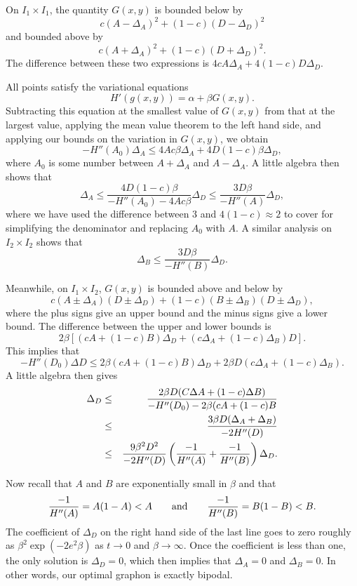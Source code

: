 \documentclass[12pt]{amsart}
\newcommand\be{\begin{equation}}
\newcommand\ee{\end{equation}}
\begin{document}
{On $I_1 \times I_1$, the quantity $G(x,y)$ is bounded below by 
\be c (A- \Delta_A)^2 + (1-c) (D - \Delta_D)^2 \ee
and bounded above by 
\be c (A+ \Delta_A)^2 + (1-c) (D + \Delta_D)^2. \ee
The difference between these two expressions is $4cA\Delta_A + 4(1-c)D \Delta_D$. 

All points satisfy the variational equations 
\be H'(g(x,y)) = \alpha + \beta G(x,y). \ee
Subtracting this equation at the smallest value of $G(x,y)$ from that at the largest value, applying 
the mean value theorem to the left hand side, and applying our bounds on the variation in 
$G(x,y)$, we obtain
\be - H''(A_0) \Delta _A \le 4Ac\beta \Delta_A + 4D(1-c)\beta \Delta_D, \ee
where $A_0$ is some number between $A+\Delta_A$ and $A-\Delta_A$.  A little algebra then shows that 
\be \Delta_A \le \frac{4D(1-c)\beta}{-H''(A_0) - 4Ac\beta} \Delta_D \le \frac{3D\beta}{-H''(A)} \Delta_D,\ee
where we have used the difference between 3 and $4(1-c) \approx 2$ to cover for simplifying the 
denominator and replacing $A_0$ with $A$. A similar analysis on $I_2 \times I_2$ shows that 
\be \Delta_B \le \frac{3D\beta}{-H''(B)} \Delta_D. \ee

Meanwhile, on $I_1 \times I_2$, $G(x,y)$ is bounded above and below by 
\be c(A \pm \Delta_A)(D \pm \Delta_D) + (1-c)(B \pm \Delta_B)(D \pm \Delta_D), \ee
where the plus signs give an upper bound and the minus signs give a lower bound. The difference between
the upper and lower bounds is 
\be 2 \beta [ (cA+(1-c)B)\Delta_D + (c \Delta_A + (1-c) \Delta_B) D]. \ee
This implies that 
\be -H''(D_0) \Delta D  \le 2\beta (cA+(1-c)B) \Delta_D + 2 \beta D (c \Delta_A + (1-c)\Delta_B). \ee
A little algebra then gives 
\begin{eqnarray} 
\Delta_D &\le& \frac{2 \beta D (C \Delta A + (1-c)\Delta B)}{-H''(D_0)-2\beta(cA+(1-c)B} \cr 
& \le & \frac{3 \beta D(\Delta_A + \Delta_B)}{-2H''(D)} \cr 
&\le & \frac{9 \beta^2 D^2}{-2H''(D)} \left( \frac{-1}{H''(A)} + \frac{-1}{H''(B)} \right ) \Delta_D. 
\end{eqnarray}

Now recall that $A$ and $B$ are exponentially small in $\beta$ and that 
\be \frac{-1}{H''(A)} = A(1-A) < A \qquad \hbox{and} \qquad \frac{-1}{H''(B)} = B(1-B) < B.\ee
The coefficient of $\Delta_D$ on the right hand side of the last 
line goes to zero roughly as $\beta^2 \exp(-2e^2 \beta)$ as $t \to 0$ and $\beta \to \infty$. Once
the coefficient is less than one, the only solution is $\Delta_D = 0$, which then implies that 
$\Delta_A=0$ and $\Delta_B=0$. In other words, our optimal graphon is exactly bipodal. 

}
\end{document}
